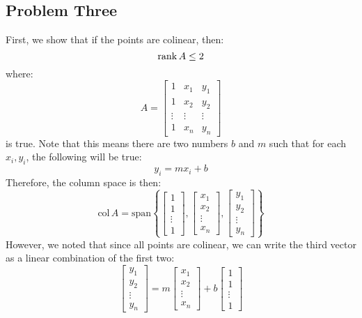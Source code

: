 \documentclass{article}
\newcommand{\spann}[1]{\mathrm{span}\left\{#1\right\}}
\newcommand{\col}[1]{\mathrm{col\,} #1}
\begin{document}
\subsection*{Problem Three}
First, we show that if the points are colinear, then:
\begin{equation}
    \rank A \le 2
\end{equation}
where:
\begin{equation}
    A = \begin{bmatrix}
        1 & x_1 & y_1 \\ 
        1 & x_2 & y_2 \\ 
        \vdots & \vdots & \vdots \\ 
        1 & x_n & y_n
    \end{bmatrix}
\end{equation}
is true. Note that this means there are two numbers $b$ and $m$ such that for each $x_i, y_i$, the following will be true:
\begin{equation}
    y_i = mx_i + b
\end{equation}
Therefore, the column space is then:
\begin{equation}
    \col A = \spann{\begin{bmatrix}
        1\\1\\ \vdots \\ 1
    \end{bmatrix}, \begin{bmatrix}
        x_1\\x_2\\\vdots \\ x_n
    \end{bmatrix}, \begin{bmatrix}
        y_1\\y_2\\\vdots \\ y_n
    \end{bmatrix}}
\end{equation}
However, we noted that since all points are colinear, we can write the third vector as a linear combination of the first two:
\begin{equation}
    \begin{bmatrix}
        y_1\\y_2\\\vdots \\ y_n
    \end{bmatrix} = m\begin{bmatrix}
        x_1\\x_2\\\vdots \\ x_n
    \end{bmatrix} + b\begin{bmatrix}
        1\\1\\ \vdots \\ 1
    \end{bmatrix}
\end{equation}
\end{document}
